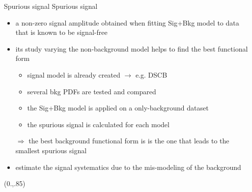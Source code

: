 \documentclass[10pt,UKenglish, leqno, xcolor = dvipsnames]{beamer}
\begin{document}
		\begin{frame}{Spurious signal}
			\vfill
			Spurious signal
			\begin{itemize}
				\item a non-zero signal amplitude obtained when fitting Sig+Bkg model to data that is known to be signal-free
				\item its study varying the non-background model helps to find the best functional form
				\begin{itemize}
					\item signal model is already created $\to$ e.g. DSCB 
					\item several bkg PDFs are tested and compared
					\item the Sig+Bkg model is applied on a only-background dataset
					\item the spurious signal is calculated for each model
				\end{itemize}
				$\Rightarrow$ the best background functional form is is the one that leads to the smallest spurious signal
				\item estimate the signal systematics due to the mis-modeling of the background
			\end{itemize}
			\vfill
			\begin{textblock}{1}(0.,.85)
				\begin{figure}
				\end{figure}
			\end{textblock}
		\end{frame}
	
\end{document}
